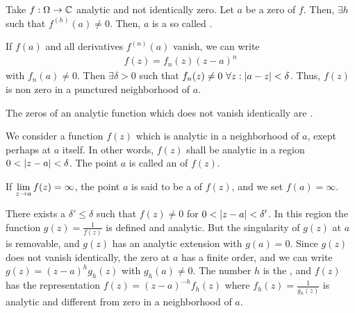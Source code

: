 \begin{definition}
    Take $f: \Omega \rightarrow \mathbb{C}$ analytic and not identically zero. Let $a$ be
    a zero of $f$. Then, $\exists h$ such that $f^{(h)} (a) \neq 0$. Then, $a$ is a
    so called .
\end{definition}

\begin{theorem}
    If $f(a)$ and all derivatives $f^{(n)} (a)$ vanish, we can write
    \begin{align*}
        f(z) = f_n(z) (z-a)^n
    \end{align*}
    with $f_n(a) \neq 0$. Then $\exists \delta > 0$ such that $f_n(z) \neq 0 \
    \forall z : \left\vert a-z \right\vert < \delta$. Thus, $f(z)$ is non zero in a punctured
    neighborhood of $a$.
\end{theorem}

\begin{definition}
    The zeros of an analytic function which does not vanish identically are .
\end{definition}

\begin{definition}
    We consider a function $f(z)$ which is analytic in a neighborhood of $a$, exept
    perhaps at $a$ itself. In other words, $f(z)$ shall be analytic in a region
    $0 < \left\vert z-a \right\vert < \delta$. The point $a$ is called an 
    of $f(z)$.
\end{definition}

\begin{definition}[Pole]
    If $\lim\limits_{z \rightarrow a} f(z) = \infty$, the point $a$ is said to be a 
    of $f(z)$, and we set $f(a) = \infty$.
\end{definition}

\begin{definition}
    There exists a $\delta' \leq \delta$ such that $f(z) \neq 0$ for
    $0<\left\vert z-a \right\vert<\delta'$. In this region the function $g(z) = \frac{1}{f(z)}$ is
    defined and analytic. But the singularity of $g(z)$ at $a$ is removable, and
    $g(z)$ has an analytic extension with $g(a) = 0$. Since $g(z)$ does not vanish
    identically, the zero at $a$ has a finite order, and we can write $g(z) =
    (z-a)^h g_h (z)$ with $g_h (a) \neq 0$. The number $h$ is the \fat{order of the
    pole}, and $f(z)$ has the representation $f(z) = (z-a)^{-h} f_h(z)$ where
    $f_h(z) = \frac{1}{g_h(z)}$ is analytic and different from zero in a neighborhood
    of $a$.
\end{definition}

